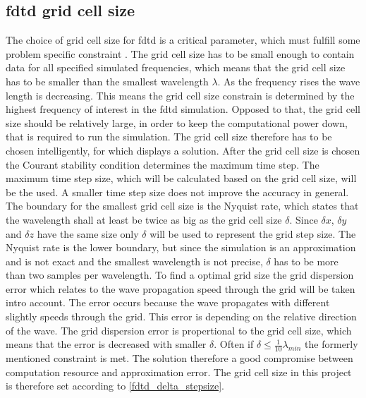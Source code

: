          \startexplain
    \stopexplain



\subsection{\gls{fdtd} grid cell size}

The choice of grid cell size for \gls{fdtd} is a critical parameter, which must fulfill some problem specific constraint \citep{Kunz1993}. The grid cell size has to be small enough to contain data for all specified simulated frequencies, which means that the grid cell size has to be smaller than the smallest wavelength $\lambda$. As the frequency rises the wave length is decreasing. This means the grid cell size constrain is determined by the highest frequency of interest in the \gls{fdtd} simulation. Opposed to that, the grid cell size should be relatively large, in order to keep the computational power down, that is required to run the simulation. The grid cell size therefore has to be chosen intelligently, for which \citep{Kunz1993} displays a solution. After the grid cell size is chosen the Courant stability condition determines the maximum time step. The maximum time step size, which will be calculated based on the grid cell size, will be the used. A smaller time step size does not improve the accuracy in general. \\


The boundary for the smallest grid cell size is the Nyquist rate, which states that the wavelength shall at least be twice as big as the grid cell size $\delta$. Since $\delta x$, $\delta y$ and $\delta z$ have the same size only $\delta$ will be used to represent the grid step size. The Nyquist rate is the lower boundary, but since the simulation is an approximation and is not exact and the smallest wavelength is not precise, $\delta$ has to be more than two samples per wavelength. To find a optimal grid size the grid dispersion error which relates to the wave propagation speed through the grid will be taken intro account. The error occurs because the wave propagates with different slightly speeds through the grid. This error is depending on the relative direction of the wave. The grid dispersion error is propertional to the grid cell size, which means that the error is decreased with smaller $\delta$\citep{Kunz1993}. 
Often if $ \delta \leq \frac{1}{10}\lambda_{min}$ the formerly mentioned constraint is met. The solution therefore a good compromise between computation resource and approximation error. The grid cell size in this project is therefore set according to \autoref{fdtd_delta_stepsize}.

